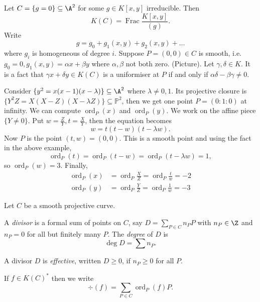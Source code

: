 \documentclass[a4paper]{article}
\theoremstyle{definition}
\renewcommand*{\P}{\mathbb{P}}
\DeclareMathOperator{\ord}{ord}
\begin{document}
\begin{eg}
  Let \(C = \{g = 0\} \subseteq \A^2\) for some \(g \in K[x, y]\) irreducible. Then
  \[
    K(C) = \operatorname{Frac} \frac{K[x, y]}{(g)}.
  \]
  Write
  \[
    g = g_0 + g_1(x, y) + g_2(x, y) + \dots
  \]
  where \(g_i\) is homogeneous of degree \(i\). Suppose \(P = (0, 0) \in C\) is smooth, i.e.\ \(g_0 = 0, g_1(x, y) = \alpha x + \beta y\) where \(\alpha, \beta\) not both zero. (Picture). Let \(\gamma, \delta \in K\). It is a fact that \(\gamma x + \delta y \in K(C)\) is a uniformiser at \(P\) if and only if \(\alpha \delta - \beta \gamma \neq 0\).
\end{eg}

\begin{eg}
  Consider \(\{y^2 = x(x - 1)(x - \lambda)\} \subseteq \A^2\) where \(\lambda \neq 0, 1\). Its projective closure is \(\{Y^2Z = X(X - Z)(X - \lambda Z)\} \subseteq \P^2\), then we get one point \(P = (0: 1: 0)\) at infinity. We can compute \(\ord_P(x)\) and \(\ord_P(y)\). We work on the affine piece \(\{Y \neq 0\}\). Put \(w = \frac{Z}{Y}, t = \frac{X}{Y}\), then the equation becomes
  \[
    w = t(t - w)(t - \lambda w).
  \]
  Now \(P\) is the point \((t, w) = (0, 0)\). This is a smooth point and using the fact in the above example,
  \[
    \ord_P(t) = \ord_P(t - w) = \ord_P(t - \lambda w) = 1,
  \]
  so \(\ord_P(w) = 3\). Finally,
  \begin{align*}
    \ord_P(x) &= \ord_P \frac{X}{Z} = \ord_P \frac{t}{w} = -2 \\
    \ord_P(y) &= \ord_P \frac{Y}{Z} = \ord_P \frac{1}{w} = -3
  \end{align*}
\end{eg}

Let \(C\) be a smooth projective curve.

\begin{definition}[divisor]
  A \emph{divisor} is a formal sum of points on \(C\), say \(D = \sum_{P \in C} n_P P\) with \(n_P \in \Z\) and \(n_P = 0\) for all but finitely many \(P\). The \emph{degree} of \(D\) is
  \[
    \deg D = \sum n_P.
  \]
\end{definition}

\begin{definition}
  A divisor \(D\) is \emph{effective}, written \(D \geq 0\), if \(n_P \geq 0\) for all \(P\).
\end{definition}

If \(f \in K(C)^*\) then we write
\[
  \div(f) = \sum_{P \in C} \ord_P(f) P.
\]
\end{document}
